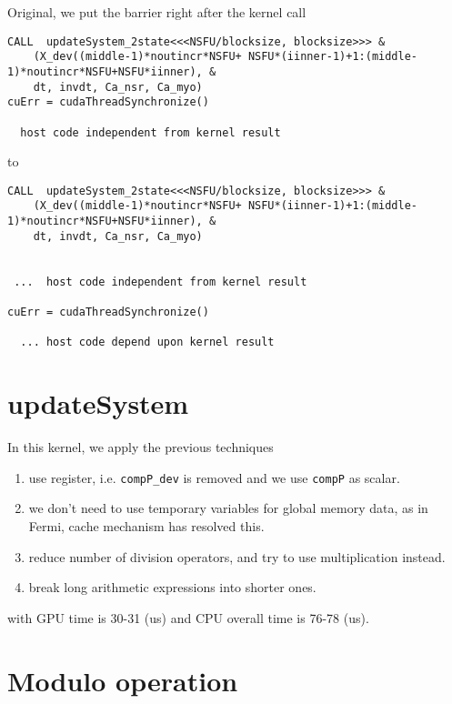 Original, we put the barrier right after the kernel call
\begin{lstlisting}
CALL  updateSystem_2state<<<NSFU/blocksize, blocksize>>> &
    (X_dev((middle-1)*noutincr*NSFU+ NSFU*(iinner-1)+1:(middle-1)*noutincr*NSFU+NSFU*iinner), &
    dt, invdt, Ca_nsr, Ca_myo)
cuErr = cudaThreadSynchronize()

  host code independent from kernel result
\end{lstlisting}
to 
\begin{lstlisting}
CALL  updateSystem_2state<<<NSFU/blocksize, blocksize>>> &
    (X_dev((middle-1)*noutincr*NSFU+ NSFU*(iinner-1)+1:(middle-1)*noutincr*NSFU+NSFU*iinner), &
    dt, invdt, Ca_nsr, Ca_myo)


 ...  host code independent from kernel result

cuErr = cudaThreadSynchronize()

  ... host code depend upon kernel result
\end{lstlisting}

\section{updateSystem}
\label{sec:updatesystem}

In this kernel, we apply the previous techniques
\begin{enumerate}
\item use register, i.e. \verb!compP_dev! is removed and we use
  \verb!compP! as scalar.
\item we don't need to use temporary variables for global memory data,
  as in Fermi, cache mechanism has resolved this. 

\item reduce number of division operators, and try to use
  multiplication instead. 
\item break long arithmetic expressions into shorter ones. 
\end{enumerate}
with GPU time is 30-31 (us) and CPU overall time is 76-78 (us). 



\section{Modulo operation}
\label{sec:modulo-operation}


